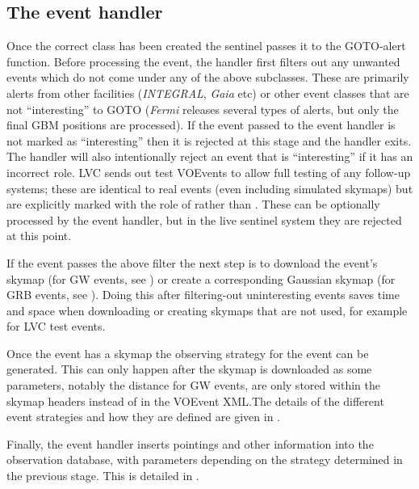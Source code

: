\subsection{The event handler}
\label{sec:event_handler}
\begin{colsection}

Once the correct  class has been created the sentinel passes it to the GOTO-alert  function. Before processing the event, the handler first filters out any unwanted events which do not come under any of the above subclasses. These are primarily alerts from other facilities (\textit{INTEGRAL}, \textit{Gaia} etc) or other event classes that are not ``interesting'' to GOTO (\textit{Fermi} releases several types of alerts, but only the final GBM positions are processed). If the event passed to the event handler is not marked as ``interesting'' then it is rejected at this stage and the handler exits. The handler will also intentionally reject an event that is ``interesting'' if it has an incorrect role. LVC sends out test VOEvents to allow full testing of any follow-up systems; these are identical to real events (even including simulated skymaps) but are explicitly marked with the role of  rather than . These can be optionally processed by the event handler, but in the live sentinel system they are rejected at this point.

If the event passes the above filter the next step is to download the event's skymap (for GW events, see ) or create a corresponding Gaussian skymap (for GRB events, see ). Doing this after filtering-out uninteresting events saves time and space when downloading or creating skymaps that are not used, for example for LVC test events.

Once the event has a skymap the observing strategy for the event can be generated. This can only happen after the skymap is downloaded as some parameters, notably the distance for GW events, are only stored within the skymap headers instead of in the VOEvent XML.\@ The details of the different event strategies and how they are defined are given in .

Finally, the event handler inserts pointings and other information into the observation database, with parameters depending on the strategy determined in the previous stage. This is detailed in .

\newpage

\end{colsection}

